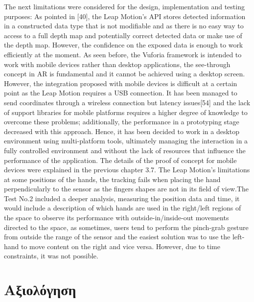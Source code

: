 The next limitations were considered for the design, implementation and testing purposes:  As pointed in [40], the Leap Motion’s API stores detected information in a constructed data type that is not modifiable and as there is no easy way to access to a full depth map and potentially correct detected data or make use of the depth map. However, the confidence on the exposed data is enough to work efficiently at the moment.  As seen before, the Vuforia framework is intended to work with mobile devices rather than desktop applications, the see-through concept in AR is fundamental and it cannot be achieved using a desktop screen. However, the integration proposed with mobile devices is difficult at a certain point as the Leap Motion requires a USB connection. It has been managed to send coordinates through a wireless connection but latency issues[54] and the lack of support libraries for mobile platforms requires a higher degree of knowledge to overcome these problems; additionally, the performance in a prototyping stage decreased with this approach. Hence, it has been decided to work in a desktop environment using multi-platform tools, ultimately managing the interaction in a fully controlled environment and without the lack of resources that influence the performance of the application. The details of the proof of concept for mobile devices were explained in the previous chapter 3.7.  The Leap Motion’s limitations at some positions of the hands, the tracking fails when placing the hand perpendicularly to the sensor as the fingers shapes are not in its field of view.The Test No.2 included a deeper analysis, measuring the position data and time, it would include a description of which hands are used in the right/left regions of the space to observe its performance with outside-in/inside-out movements directed to the space, as sometimes, users tend to perform the pinch-grab gesture from outside the range of the sensor and the easiest solution was to use the left-hand to move content on the right and vice versa. However, due to time constraints, it was not possible.

\section{Αξιολόγηση}
